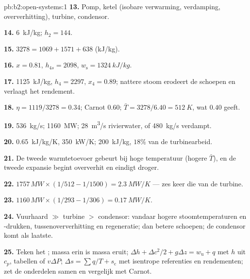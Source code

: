 \begin{solution}{pb:b2:open-systems:1}
\textbf{13.} Pomp, ketel (isobare verwarming, verdamping, oververhitting),
turbine, condensor.

\textbf{14.} \qty{6}{kJ/kg}; $h_2 = 144$.

\textbf{15.} $3278 = 1069 + 1571 + 638$ (\unit{kJ/kg}).

\textbf{16.} $x = 0.81$, $h_{4s} = 2098$, $w_{\text{s}} = \qty{1324}{kJ/kg}$.

\textbf{17.} \qty{1125}{kJ/kg}, $h_4 = 2297$, $x_4 = 0.89$; nattere stoom
erodeert de
schoepen en verlaagt het rendement.

\textbf{18.} $\eta = 1119/3278 = 0.34$; Carnot $0.60$;
$\bar T = 3278/6.40 =
\qty{512}{K}$, wat $0.40$ geeft.

\textbf{19.} \qty{536}{kg/s}; \qty{1160}{MW}; \qty{28}{m^3/s} rivierwater,
of \qty{480}{kg/s} verdampt.

\textbf{20.} \qty{0.65}{kJ/kg/K}, \qty{350}{kW/K}; \qty{200}{kJ/kg}, $18\%$ van de
turbinearbeid.

\textbf{21.} De tweede warmtetoevoer gebeurt bij hoge temperatuur (hogere
$\bar T$), en de tweede expansie begint oververhit en eindigt droger.

\textbf{22.} $1757\,\unit{MW} \times (1/512 - 1/1500) = \qty{2.3}{MW/K}$ ---
zes keer
die van de turbine.

\textbf{23.} $1160\,\unit{MW} \times (1/293 - 1/306) = \qty{0.17}{MW/K}$.

\textbf{24.} Vuurhaard $\gg$ turbine $>$ condensor: vandaar hogere
stoom\-temperaturen
en -drukken, tussenoververhitting en regeneratie; dan betere
schoepen; de condensor komt als laatste.

\textbf{25.} Teken het ; massa erin is massa eruit;
$\Delta h +
\Delta c^2/2 + g\Delta z = w_{\text{u}} + q$ met $h$ uit $c_p$,
tabellen of
$v\Delta P$; $\Delta s = \sum q/T + s_{\text{c}}$ met isentrope referenties en
rendementen; zet de onderdelen samen en vergelijk met Carnot.
\end{solution}
